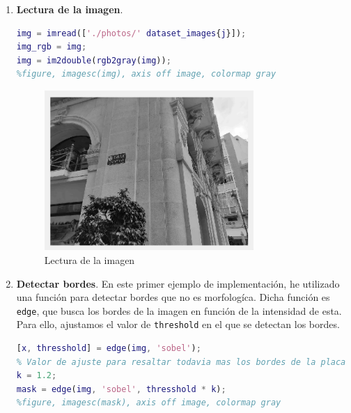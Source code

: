 \documentclass[12pt]{article}
\begin{document}
	\begin{enumerate}
		\item \textbf{Lectura de la imagen}.
		\begin{lstlisting}[language=matlab, caption={Lectura de la imagen}]
% Leer imagen
img = imread(['./photos/' dataset_images{j}]);
img_rgb = img;
img = im2double(rgb2gray(img));
%figure, imagesc(img), axis off image, colormap gray
		\end{lstlisting}
	
		\begin{figure}[h!]
			\begin{center}
				\includegraphics[width=0.75\textwidth]{img/impl_1.png}
				\caption{Lectura de la imagen}
				\label{img: lectura}
			\end{center}
		\end{figure}
	
		\pagebreak
	
		\item \textbf{Detectar bordes}. En este primer ejemplo de implementación, he utilizado una función para detectar bordes que no es morfologíca. Dicha función es \texttt{edge}, que busca los bordes de la imagen en función de la intensidad de esta. Para ello, ajustamos el valor de \texttt{threshold} en el que se detectan los bordes.
		\begin{lstlisting}[language=matlab, caption={Detectar bordes I}]
% Detectar bordes (segmentacion)
[x, thresshold] = edge(img, 'sobel');
% Valor de ajuste para resaltar todavia mas los bordes de la placa
k = 1.2;  
mask = edge(img, 'sobel', thresshold * k);
%figure, imagesc(mask), axis off image, colormap gray
		\end{lstlisting}
	

\end{enumerate}
\end{document}
